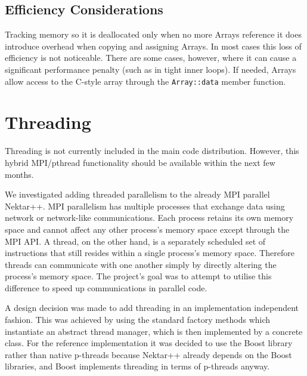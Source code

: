 \subsection{Efficiency Considerations}

Tracking memory so it is deallocated only when no more Arrays reference it does
introduce overhead when copying and assigning Arrays. In most cases this loss of
efficiency is not noticeable. There are some cases, however, where it can cause
a significant performance penalty (such as in tight inner loops). If needed,
Arrays allow access to the C-style array through the \texttt{Array::data} member
function.


\section{Threading}
\begin{notebox}
Threading is not currently included in the main code distribution. However, this
hybrid MPI/pthread functionality should be available within the next few months.
\end{notebox}

We investigated adding threaded parallelism to the already MPI parallel
Nektar++.  MPI parallelism has multiple processes that exchange data using
network or network-like communications.  Each process retains its own memory
space and cannot affect any other process’s memory space except through the MPI
API.  A thread, on the other hand, is a separately scheduled set of instructions
that still resides within a single process’s memory space.  Therefore threads
can communicate with one another simply by directly altering the process’s
memory space.  The project's goal was to attempt to utilise this difference to
speed up communications in parallel code.

A design decision was made to add threading in an implementation independent
fashion.  This was achieved by using the standard factory methods which
instantiate an abstract thread manager, which is then implemented by a concrete
class.  For the reference implementation it was decided to use the Boost library
rather than native p-threads because Nektar++ already depends on the Boost
libraries, and Boost implements threading in terms of p-threads anyway.

